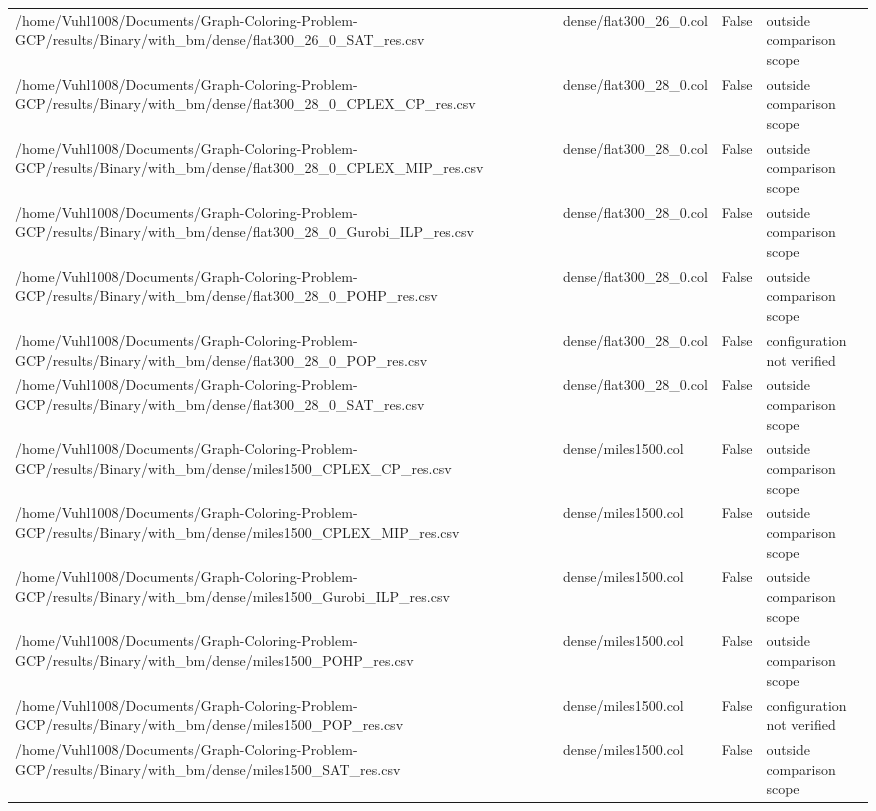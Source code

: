 \begin{table}[htbp]
\begin{tabular}{llll}
/home/Vuhl1008/Documents/Graph-Coloring-Problem-GCP/results/Binary/with\_bm/dense/flat300\_26\_0\_SAT\_res.csv & dense/flat300\_26\_0.col & False & outside comparison scope \\
/home/Vuhl1008/Documents/Graph-Coloring-Problem-GCP/results/Binary/with\_bm/dense/flat300\_28\_0\_CPLEX\_CP\_res.csv & dense/flat300\_28\_0.col & False & outside comparison scope \\
/home/Vuhl1008/Documents/Graph-Coloring-Problem-GCP/results/Binary/with\_bm/dense/flat300\_28\_0\_CPLEX\_MIP\_res.csv & dense/flat300\_28\_0.col & False & outside comparison scope \\
/home/Vuhl1008/Documents/Graph-Coloring-Problem-GCP/results/Binary/with\_bm/dense/flat300\_28\_0\_Gurobi\_ILP\_res.csv & dense/flat300\_28\_0.col & False & outside comparison scope \\
/home/Vuhl1008/Documents/Graph-Coloring-Problem-GCP/results/Binary/with\_bm/dense/flat300\_28\_0\_POHP\_res.csv & dense/flat300\_28\_0.col & False & outside comparison scope \\
/home/Vuhl1008/Documents/Graph-Coloring-Problem-GCP/results/Binary/with\_bm/dense/flat300\_28\_0\_POP\_res.csv & dense/flat300\_28\_0.col & False & configuration not verified \\
/home/Vuhl1008/Documents/Graph-Coloring-Problem-GCP/results/Binary/with\_bm/dense/flat300\_28\_0\_SAT\_res.csv & dense/flat300\_28\_0.col & False & outside comparison scope \\
/home/Vuhl1008/Documents/Graph-Coloring-Problem-GCP/results/Binary/with\_bm/dense/miles1500\_CPLEX\_CP\_res.csv & dense/miles1500.col & False & outside comparison scope \\
/home/Vuhl1008/Documents/Graph-Coloring-Problem-GCP/results/Binary/with\_bm/dense/miles1500\_CPLEX\_MIP\_res.csv & dense/miles1500.col & False & outside comparison scope \\
/home/Vuhl1008/Documents/Graph-Coloring-Problem-GCP/results/Binary/with\_bm/dense/miles1500\_Gurobi\_ILP\_res.csv & dense/miles1500.col & False & outside comparison scope \\
/home/Vuhl1008/Documents/Graph-Coloring-Problem-GCP/results/Binary/with\_bm/dense/miles1500\_POHP\_res.csv & dense/miles1500.col & False & outside comparison scope \\
/home/Vuhl1008/Documents/Graph-Coloring-Problem-GCP/results/Binary/with\_bm/dense/miles1500\_POP\_res.csv & dense/miles1500.col & False & configuration not verified \\
/home/Vuhl1008/Documents/Graph-Coloring-Problem-GCP/results/Binary/with\_bm/dense/miles1500\_SAT\_res.csv & dense/miles1500.col & False & outside comparison scope \\

\end{tabular}
\end{table}
